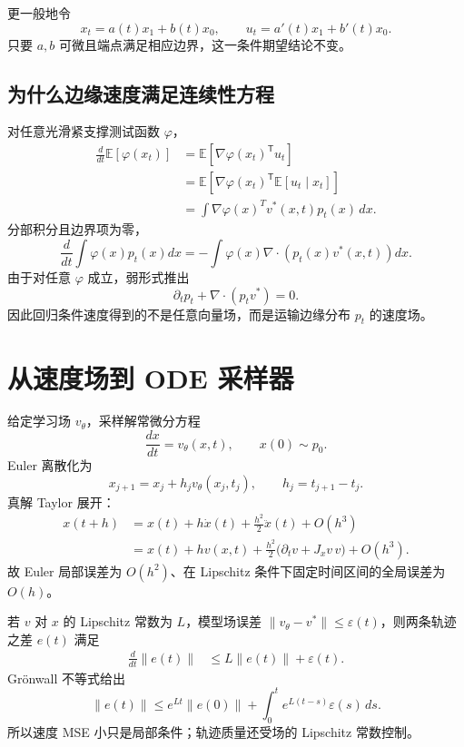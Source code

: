 \documentclass[11pt]{article}
\numberwithin{equation}{section}
\newcommand{\E}{\mathbb{E}}
\newcommand{\1}{\mathbf{1}}
\newcommand{\T}{\mathsf{T}}
\begin{document}
更一般地令
\begin{equation}
 x_t=a(t)x_1+b(t)x_0,\qquad
 u_t=a'(t)x_1+b'(t)x_0.
\end{equation}
只要 $a,b$ 可微且端点满足相应边界，这一条件期望结论不变。

\subsection{为什么边缘速度满足连续性方程}

对任意光滑紧支撑测试函数 $\varphi$，
\begin{align}
 \frac{d}{dt}\E[\varphi(x_t)]
 &=\E[\nabla\varphi(x_t)^\T u_t]\\
 &=\E\left[\nabla\varphi(x_t)^\T
 \E[u_t\mid x_t]\right]\\
 &=\int \nabla\varphi(x)^Tv^*(x,t)p_t(x)\,dx.
\end{align}
分部积分且边界项为零，
\begin{equation}
 \frac{d}{dt}\int\varphi(x)p_t(x)dx
 =-\int\varphi(x)\nabla\!\cdot(p_t(x)v^*(x,t))dx.
\end{equation}
由于对任意 $\varphi$ 成立，弱形式推出
\begin{equation}
 \boxed{\partial_t p_t+\nabla\!\cdot(p_tv^*)=0.}
\end{equation}
因此回归条件速度得到的不是任意向量场，而是运输边缘分布 $p_t$ 的速度场。

\section{从速度场到 ODE 采样器}

给定学习场 $v_\theta$，采样解常微分方程
\begin{equation}
 \frac{dx}{dt}=v_\theta(x,t),\qquad x(0)\sim p_0.
\end{equation}
Euler 离散化为
\begin{equation}
 x_{j+1}=x_j+h_jv_\theta(x_j,t_j),
 \qquad h_j=t_{j+1}-t_j.
\end{equation}
真解 Taylor 展开：
\begin{align}
 x(t+h)
 &=x(t)+h\dot x(t)+\frac{h^2}{2}\ddot x(t)+O(h^3)\\
 &=x(t)+hv(x,t)
 +\frac{h^2}{2}\bigl(\partial_tv+J_xv\,v\bigr)+O(h^3).
\end{align}
故 Euler 局部误差为 $O(h^2)$、在 Lipschitz 条件下固定时间区间的全局误差为 $O(h)$。

若 $v$ 对 $x$ 的 Lipschitz 常数为 $L$，模型场误差
$\|v_\theta-v^*\|\le\varepsilon(t)$，则两条轨迹之差 $e(t)$ 满足
\begin{align}
 \frac{d}{dt}\|e(t)\|
 &\le L\|e(t)\|+\varepsilon(t).
\end{align}
Grönwall 不等式给出
\begin{equation}
 \|e(t)\|
 \le e^{Lt}\|e(0)\|+
 \int_0^t e^{L(t-s)}\varepsilon(s)\,ds.
\end{equation}
所以速度 MSE 小只是局部条件；轨迹质量还受场的 Lipschitz 常数控制。
\end{document}
